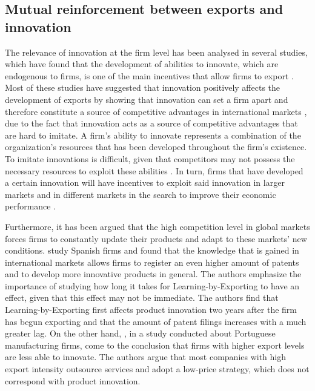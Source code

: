 \subsection{Mutual reinforcement between exports and innovation}
The relevance of innovation at the firm level has been analysed in several studies, which have found that the development of abilities to innovate, which are endogenous to firms, is one of the main incentives that allow firms to export \citep{Leonidas2007}. Most of these studies have suggested that innovation positively affects the development of exports by showing that innovation can set a firm apart and therefore constitute a source of competitive advantages in international markets \citep{LopezRodriguez2005}, due to the fact that innovation acts as a source of competitive advantages that are hard to imitate. A firm's ability to innovate represents a combination of the organization's resources that has been developed throughout the firm's existence. To imitate innovations is difficult, given that competitors may not possess the necessary resources to exploit these abilities \citep{MillerShamsie1996}. In turn, firms that have developed a certain innovation will have incentives to exploit said innovation in larger markets and in different markets in the search to improve their economic performance \citep{PlaBarberAlegre2007}.  

Furthermore, it has been argued that the high competition level in global markets forces firms to constantly update their products and adapt to these markets' new conditions. \cite{SalomonShaver2005} study Spanish firms and found that the knowledge that is gained in international markets allows firms to register an even higher amount of patents and to develop more innovative products in general. The authors emphasize the importance of studying how long it takes for Learning-by-Exporting to have an effect, given that this effect may not be immediate. The authors find that Learning-by-Exporting first affects product innovation two years after the firm has begun exporting and that the amount of patent filings increases with a much greater lag. On the other hand, \cite{Silva2007}, in a study conducted about Portuguese manufacturing firms, come to the conclusion that firms with higher export levels are less able to innovate. The authors argue that most companies with high export intensity outsource services and adopt a low-price strategy, which does not correspond with product innovation. 

